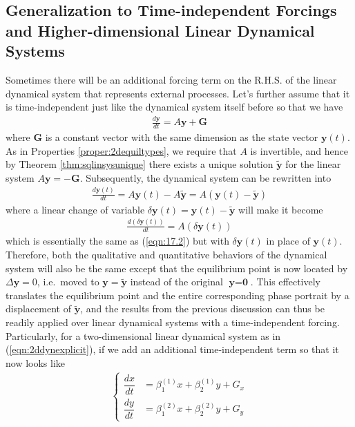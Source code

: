 \subsection{Generalization to Time-independent Forcings and Higher-dimensional Linear Dynamical Systems}

Sometimes there will be an additional forcing term on the R.H.S. of the linear dynamical system that represents external processes. Let's further assume that it is time-independent just like the dynamical system itself before so that we have
\begin{align}
\frac{d\textbf{y}}{dt} = A\textbf{y} + \textbf{G}
\end{align}
where $\textbf{G}$ is a constant vector with the same dimension as the state vector $\textbf{y}(t)$. As in Properties \ref{proper:2dequiltypes}, we require that $A$ is invertible, and hence by Theorem \ref{thm:sqlinsysunique} there exists a unique solution $\tilde{\textbf{y}}$ for the linear system $A\textbf{y} = -\textbf{G}$. Subsequently, the dynamical system can be rewritten into
\begin{align}
\frac{d\textbf{y}(t)}{dt} = A\textbf{y}(t) - A\tilde{\textbf{y}} = A(\textbf{y}(t) - \tilde{\textbf{y}})     
\end{align}
where a linear change of variable $\delta\textbf{y}(t) = \textbf{y}(t) - \tilde{\textbf{y}}$ will make it become
\begin{align}
\frac{d(\delta\textbf{y}(t))}{dt} = A(\delta\textbf{y}(t)) 
\label{eqn:translateddynsys}
\end{align}
which is essentially the same as (\ref{eqn:17.2}) but with $\delta\textbf{y}(t)$ in place of $\textbf{y}(t)$. Therefore, both the qualitative and quantitative behaviors of the dynamical system will also be the same except that the equilibrium point is now located by $\Delta \textbf{y} = 0$, i.e.\ moved to $\textbf{y} = \tilde{\textbf{y}}$ instead of the original $\textbf{y} = \textbf{0}$. This effectively translates the equilibrium point and the entire corresponding phase portrait by a displacement of $\tilde{\textbf{y}}$, and the results from the previous discussion can thus be readily applied over linear dynamical systems with a time-independent forcing. Particularly, for a two-dimensional linear dynamical system as in (\ref{eqn:2ddynexplicit}), if we add an additional time-independent term so that it now looks like
\begin{align}
\begin{cases}
\dfrac{dx}{dt} &= \beta_1^{(1)} x + \beta_2^{(1)} y + G_x \\[10pt]
\dfrac{dy}{dt} &= \beta_1^{(2)} x + \beta_2^{(2)} y + G_y 
\end{cases}    
\end{align}
